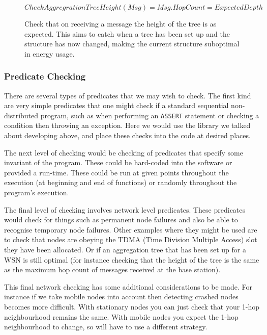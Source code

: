 \documentclass[a4paper]{article}
\begin{document}
\begin{figure}[H]
\begin{center}
    \begin{displaymath}
	CheckAggregrationTreeHeight(Msg) = Msg.HopCount = ExpectedDepth
	\end{displaymath}
	\caption{Check that on receiving a message the height of the tree is as expected. This aims to catch when a tree has been set up and the structure has now changed, making the current structure suboptimal in energy usage.}
\end{center}
\end{figure}

\subsubsection{Predicate Checking}

There are several types of predicates that we may wish to check. The first kind are very simple predicates that one might check if a standard sequential non-distributed program, such as when performing an \verb|ASSERT| statement or checking a condition then throwing an exception. Here we would use the library we talked about developing above, and place these checks into the code at desired places.

The next level of checking would be checking of predicates that specify some invariant of the program. These could be hard-coded into the software or provided a run-time. These could be run at given points throughout the execution (at beginning and end of functions) or randomly throughout the program's execution.

The final level of checking involves network level predicates. These predicates would check for things such as permanent node failures and also be able to recognise temporary node failures. Other examples where they might be used are to check that nodes are obeying the TDMA (Time Division Multiple Access) slot they have been allocated. Or if an aggregation tree \cite{TankBible} that has been set up for a WSN is still optimal (for instance checking that the height of the tree is the same as the maximum hop count of messages received at the base station).

This final network checking has some additional considerations to be made. For instance if we take mobile nodes into account then detecting crashed nodes becomes more difficult. With stationary nodes you can just check that your 1-hop neighbourhood remains the same. With mobile nodes you expect the 1-hop neighbourhood to change, so will have to use a different strategy.
\end{document}
